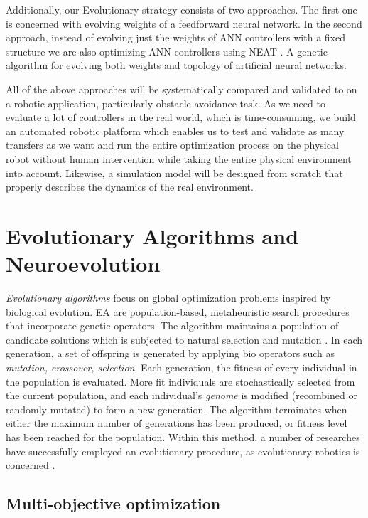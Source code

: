 Additionally, our Evolutionary strategy consists of two approaches. The first one is concerned with evolving weights of a feedforward neural network. In the second approach, instead of evolving just the weights of ANN controllers with a fixed structure we are also optimizing ANN controllers using NEAT \cite{stanley2002evolving}. A genetic algorithm for evolving both weights and topology of artificial neural networks.

All of the above approaches will be systematically compared and validated to on a robotic application, particularly obstacle avoidance task. As we need to evaluate a lot of controllers in the real world, which is time-consuming, we build an automated robotic platform which enables us to test and validate as many transfers as we want and run the entire optimization process on the physical robot without human intervention while taking the entire physical environment into account. Likewise, a simulation model will be designed from scratch that properly describes the dynamics of the real environment.

\section{Evolutionary Algorithms and Neuroevolution}

\emph{Evolutionary algorithms} focus on global optimization problems inspired by biological evolution. EA are population-based, metaheuristic search procedures that incorporate genetic operators. The algorithm maintains a population of candidate solutions which is subjected to natural selection and mutation \cite{back1996evolutionary}. In each generation, a set of offspring is generated by applying bio operators such as \emph{mutation, crossover, selection}. Each generation, the fitness of every individual in the population is evaluated. More fit individuals are stochastically selected from the current population, and each individual's \emph{genome} is modified (recombined or randomly mutated) to form a new generation. The algorithm terminates when either the maximum number of generations has been produced, or fitness level has been reached for the population. Within this method, a number of researches have successfully employed an evolutionary procedure, as evolutionary robotics is concerned \cite{salomon1999evolving} \cite{faina2017automating}.

\subsection{Multi-objective optimization}

